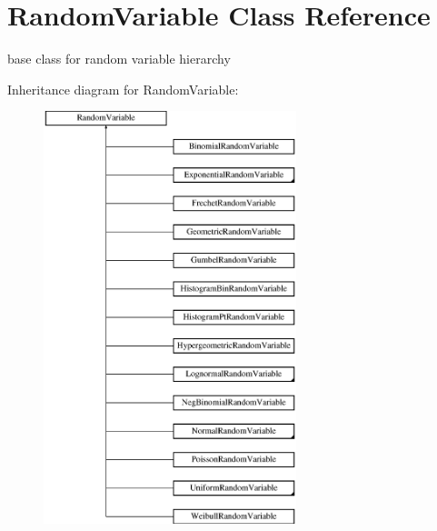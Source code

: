 \section{Random\+Variable Class Reference}
\label{classPecos_1_1RandomVariable}


base class for random variable hierarchy  


Inheritance diagram for Random\+Variable\+:\begin{figure}[H]
\begin{center}
\leavevmode
\includegraphics[height=12.000000cm]{classPecos_1_1RandomVariable}
\end{center}
\end{figure}
